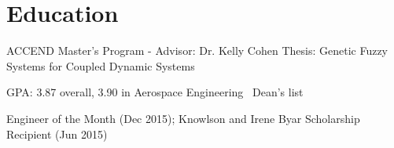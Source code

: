 \documentclass[letterpaper]{deedy-resume}
\begin{document}
\begin{minipage}[t]{\textwidth} %
\vspace{2ex}
    \section{Education}
    {}
    \begin{compactitem}
        \item ACCEND Master's Program - Advisor: Dr. Kelly Cohen
                \subitem Thesis: Genetic Fuzzy Systems for Coupled Dynamic Systems
    \end{compactitem}

    \vspace{1em}
    {}
    
    \begin{compactitem}
        \item GPA: 3.87 overall, 3.90 in Aerospace Engineering \textemdash\ Dean's list
        \item Engineer of the Month (Dec 2015); Knowlson and Irene Byar Scholarship Recipient (Jun 2015)
    \end{compactitem}

    \vspace*{2ex}

\end{minipage}
\end{document}
